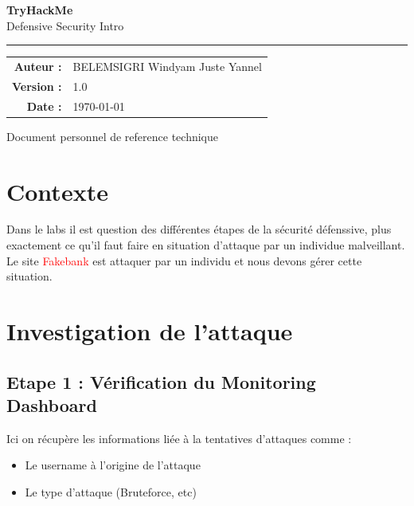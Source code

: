 \documentclass[11pt,a4paper]{book}
\begin{document}
\begin{titlepage}
\thispagestyle{empty}
\begin{center}
\vspace*{2cm}
{\Huge\sffamily\bfseries\color{bleuFonce} TryHackMe}\\[0.5em]
{\Large\sffamily\color{gris} Defensive Security Intro}
\vspace{1.5cm}

\textcolor{bleuClair}{\rule{0.3\textwidth}{1.5pt}}

\vspace{1.5cm}
\begin{tabular}{rl}
    \textcolor{gris}{\textbf{Auteur :}} & BELEMSIGRI Windyam Juste Yannel \\
    \textcolor{gris}{\textbf{Version :}} & 1.0 \\
    \textcolor{gris}{\textbf{Date :}} & \today \\
\end{tabular}

\vfill
{\small\sffamily\color{gris} Document personnel de reference technique}
\vspace{1cm}
\end{center}
\end{titlepage}

\tableofcontents
\newpage

\section{Contexte}

Dans le labs il est question des différentes étapes de la sécurité défenssive, plus exactement ce qu'il faut faire 
en situation d'attaque par un individue malveillant.
Le site \textcolor{red}{Fakebank} est attaquer par un individu et nous devons gérer cette situation.

\section{Investigation de l'attaque}
\subsection{Etape 1 : Vérification du Monitoring Dashboard}
Ici on récupère les informations liée à la tentatives d'attaques comme :
\begin{itemize}
    \item Le username à l'origine de l'attaque
    \item Le type d'attaque (Bruteforce, etc)
\end{itemize}
\end{document}
